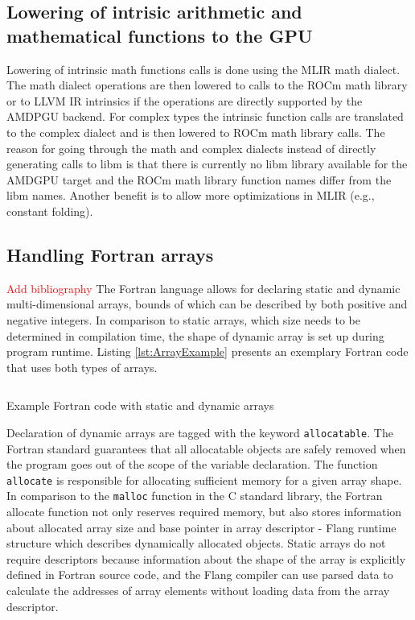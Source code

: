 \documentclass[acmtog,natbib=false]{acmart}
\newcommand{\todo}[1]{\textcolor{red}{#1}}
\newcommand{\code}[1]{\texttt{#1}\xspace}
\begin{document}
\subsection{Lowering of intrisic arithmetic and mathematical functions to the GPU}
\label{sec:FortranIntrinsics}
Lowering of intrinsic math functions calls is done using the \ac{MLIR} math dialect.
The math dialect operations are then lowered to calls to the ROCm math library or to LLVM \ac{IR} intrinsics if the operations are directly supported by the AMDPGU backend.
For complex types the intrinsic function calls are translated to the complex dialect and is then lowered to ROCm math library calls.
The reason for going through the math and complex dialects instead of directly generating calls to libm is that there is currently no libm library available for the AMDGPU target and the ROCm math library function names differ from the libm names. Another benefit is to allow more optimizations in \ac{MLIR} (e.g., constant folding).
\subsection{Handling Fortran arrays}
\todo{Add bibliography}
The Fortran language allows for declaring static and dynamic multi-dimensional arrays, bounds of which can be described by both positive and negative integers.
In comparison to static arrays, which size needs to be determined in compilation time, the shape of dynamic array is set up during program runtime.
Listing \ref{lst:ArrayExample} presents an exemplary Fortran code that uses both types of arrays.

\begin{listing}[t]
\inputminted{Fortran}{code/arrays.f90}
\caption{Example Fortran code with static and dynamic arrays}
\label{lst:ArrayExample}
\end{listing}

Declaration of dynamic arrays are tagged with the keyword \code{allocatable}.
The Fortran standard guarantees that all allocatable objects are safely removed when the program goes out of the scope of the variable declaration.
The function \code{allocate} is responsible for allocating sufficient memory for a given array shape.
In comparison to the \code{malloc} function in the C standard library, the Fortran allocate function not only reserves required memory, but also stores information about allocated array size and base pointer in array descriptor - Flang runtime structure which describes dynamically allocated
objects.
Static arrays do not require descriptors because information about the shape of the array is explicitly defined in Fortran source code, and the Flang compiler can use parsed data to calculate the addresses of array elements without loading data from the array descriptor.
\end{document}
